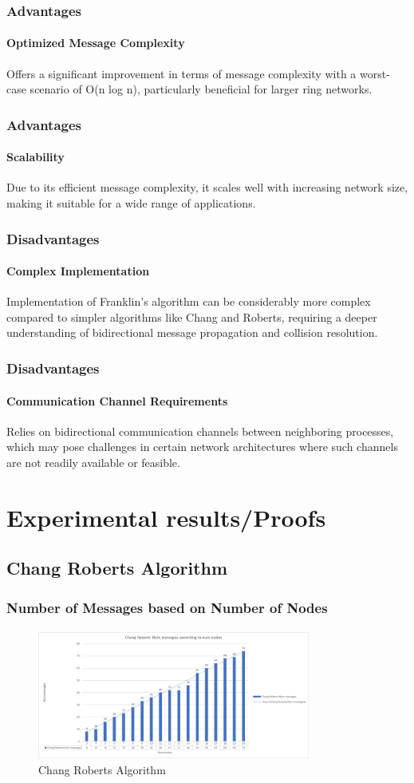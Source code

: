 \documentclass[11pt]{beamer}              %
\begin{document}
\begin{frame}
\frametitle{Advantages}
\framesubtitle{Optimized Message Complexity}
Offers a significant improvement in terms of message complexity with a worst-case scenario of O(n log n), particularly beneficial for larger ring networks.
\end{frame}

\begin{frame}
    \frametitle{Advantages}
    \framesubtitle{Scalability}
    Due to its efficient message complexity, it scales well with increasing network size, making it suitable for a wide range of applications.
\end{frame}


\begin{frame}
    \frametitle{Disadvantages}
    \framesubtitle{Complex Implementation}
    Implementation of Franklin’s algorithm can be considerably more complex compared to simpler algorithms like Chang and Roberts, requiring a deeper understanding of bidirectional message propagation and collision resolution.
\end{frame}


\begin{frame}
    \frametitle{Disadvantages}
    \framesubtitle{Communication Channel Requirements}
    Relies on bidirectional communication channels between neighboring processes, which may pose challenges in certain network architectures where such channels are not readily available or feasible.
\end{frame}







\section{Experimental results/Proofs}

\subsection{Chang Roberts Algorithm}
\begin{frame}
\frametitle{Number of Messages based on Number of Nodes}
\framesubtitle{}

\begin{figure}
    \centering
    \includegraphics[width=0.8\textwidth]{figures/changroberts_graph.png}
    \caption{Chang Roberts Algorithm}
\end{figure}
\end{frame}
\end{document}
